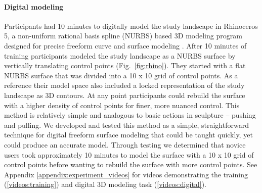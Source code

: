 \documentclass[prodmode,acmtochi]{acmsmall} %
\begin{document}
\paragraph{Digital modeling}
Participants had 10 minutes 
to digitally model the study landscape in Rhinoceros 5, 
a non-uniform rational basis spline 
(NURBS) based 3D modeling program
designed for precise freeform curve and surface modeling \cite{Rhino}.
After 10 minutes of training 
participants modeled the study landscape as a NURBS surface 
by vertically translating control points (Fig.~\ref{fig:rhino}). 
They started with a flat NURBS surface that was 
divided into a 10 x 10 grid of control points.
As a reference their model space also included 
a locked representation of the study landscape as 3D contours. 
At any point participants could rebuild the surface 
with a higher density of control points for finer, more nuanced control. 
This method is relatively simple and 
analogous to basic actions in sculpture -- pushing and pulling. 
We developed and tested this method 
as a simple, straightforward technique for  
digital freeform surface modeling
that could be taught quickly, yet could produce an accurate model. 
%  
Through testing we determined that 
novice users took approximately 10 minutes
to model the surface with a 10 x 10 grid of control points
before wanting to rebuild the surface with more control points.
%
See Appendix \ref{appendix:experiment_videos}
for videos demonstrating the training (\ref{videos:training}) 
and digital 3D modeling task (\ref{videos:digital}).
\end{document}
